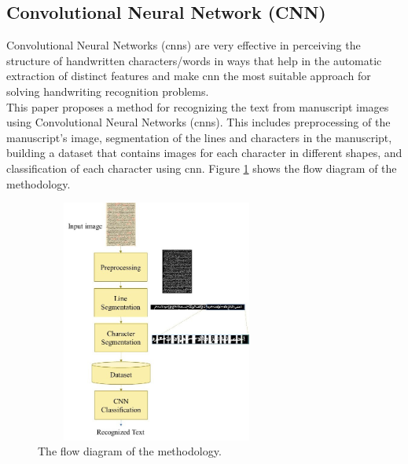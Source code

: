 \subsection{Convolutional Neural Network (CNN)}
Convolutional Neural Networks (\acrshort{cnn}s) are very effective in perceiving the structure of handwritten characters/words in ways that help in the automatic extraction of distinct features and make \acrshort{cnn} the most suitable approach for solving handwriting recognition problems.\\

This paper \cite{CNN} proposes a method for recognizing the text from manuscript images using Convolutional Neural Networks (\acrshort{cnn}s). This includes preprocessing of the manuscript’s image, segmentation of the lines and characters in the manuscript, building a dataset that contains images for each character in different shapes, and classification of each character using \acrshort{cnn}.
Figure \ref{fig:CNN} shows the flow diagram of the methodology.

\begin{figure}[!htb]
    \centering
    \includegraphics[width=8cm, height=8cm]{images/CNN.png}
    \caption{The flow diagram of the methodology.}
    \label{fig:CNN}
\end{figure}

\newpage

